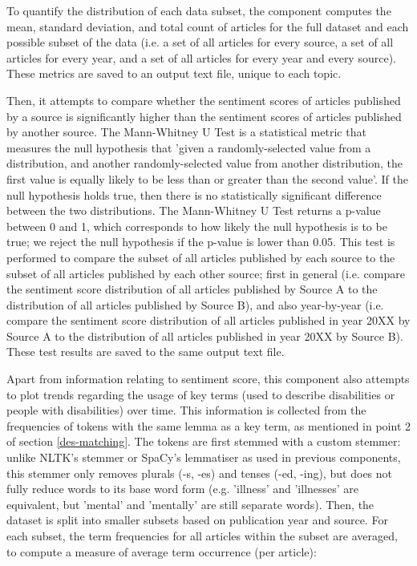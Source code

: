 \documentclass{report}
\begin{document}
To quantify the distribution of each data subset, the component computes the mean, standard deviation, and total count of articles for the full dataset and each possible subset of the data (i.e. a set of all articles for every source, a set of all articles for every year, and a set of all articles for every year and every source). 
These metrics are saved to an output text file, unique to each topic.

Then, it attempts to compare whether the sentiment scores of articles published by a source is significantly higher than the sentiment scores of articles published by another source. 
The Mann-Whitney U Test \cite{mann1947test} is a statistical metric that measures the null hypothesis that 'given a randomly-selected value from a distribution, and another randomly-selected value from another distribution, the first value is equally likely to be less than or greater than the second value'.
If the null hypothesis holds true, then there is no statistically significant difference between the two distributions.
The Mann-Whitney U Test returns a p-value between 0 and 1, which corresponds to how likely the null hypothesis is to be true; we reject the null hypothesis if the p-value is lower than 0.05.
This test is performed to compare the subset of all articles published by each source to the subset of all articles published by each other source; first in general (i.e. compare the sentiment score distribution of all articles published by Source A to the distribution of all articles published by Source B), and also year-by-year (i.e. compare the sentiment score distribution of all articles published in year 20XX by Source A to the distribution of all articles published in year 20XX by Source B). These test results are saved to the same output text file.

Apart from information relating to sentiment score, this component also attempts to plot trends regarding the usage of key terms (used to describe disabilities or people with disabilities) over time.
This information is collected from the frequencies of tokens with the same lemma as a key term, as mentioned in point 2 of section \ref{des-matching}.
The tokens are first stemmed with a custom stemmer: unlike NLTK's stemmer or SpaCy's lemmatiser as used in previous components, this stemmer only removes plurals (-s, -es) and tenses (-ed, -ing), but does not fully reduce words to its base word form (e.g. 'illness' and 'illnesses' are equivalent, but 'mental' and 'mentally' are still separate words).
Then, the dataset is split into smaller subsets based on publication year and source.
For each subset, the term frequencies for all articles within the subset are averaged, to compute a measure of average term occurrence (per article):
\end{document}
